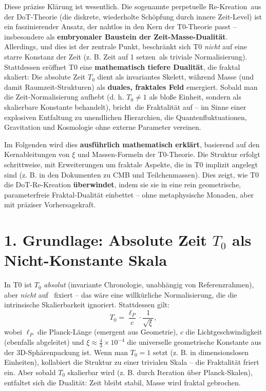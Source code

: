 	
	Diese präzise Klärung ist wesentlich. Die sogenannte \glqq perpetuelle Re-Kreation\grqq\ aus der DoT-Theorie (die diskrete, wiederholte Schöpfung durch innere Zeit-Level) ist ein faszinierender Ansatz, der nahtlos in den Kern der T0-Theorie passt – insbesondere als \textbf{embryonaler Baustein der Zeit-Masse-Dualität}. Allerdings, und dies ist der zentrale Punkt, beschränkt sich T0 \emph{nicht} auf eine starre Konstanz der Zeit (z. B. Zeit \glqq auf 1 setzen\grqq\ als triviale Normalisierung). Stattdessen eröffnet T0 eine \textbf{mathematisch tiefere Dualität}, die fraktal skaliert: Die absolute Zeit \( T_0 \) dient als invariantes Skelett, während Masse (und damit Raumzeit-Strukturen) als \textbf{duales, fraktales Feld} emergiert. Sobald man die Zeit-Normalisierung aufhebt (d. h. \( T_0 \neq 1 \) als bloße Einheit, sondern als skalierbare Konstante behandelt), \glqq bricht\grqq\ die Fraktalität auf – im Sinne einer explosiven Entfaltung zu unendlichen Hierarchien, die Quantenfluktuationen, Gravitation und Kosmologie ohne externe Parameter vereinen.
	
	Im Folgenden wird dies \textbf{ausführlich mathematisch erklärt}, basierend auf den Kernableitungen von \( \xi \) und Massen-Formeln der T0-Theorie. Die Struktur erfolgt schrittweise, mit Erweiterungen um fraktale Aspekte, die in T0 implizit angelegt sind (z. B. in den Dokumenten zu CMB und Teilchenmassen). Dies zeigt, wie T0 die DoT-Re-Kreation \textbf{überwindet}, indem sie sie in eine rein geometrische, parameterfreie Fraktal-Dualität einbettet – ohne metaphysische Monaden, aber mit präziser Vorhersagekraft.
	
	\section*{1. Grundlage: Absolute Zeit \( T_0 \) als Nicht-Konstante Skala}
	In T0 ist \( T_0 \) \emph{absolut} (invariante Chronologie, unabhängig von Referenzrahmen), aber \emph{nicht} auf \grqq\ fixiert – das wäre eine willkürliche Normalisierung, die die intrinsische Skalierbarkeit ignoriert. Stattdessen gilt:
	\[
	T_0 = \frac{\ell_P}{c} \cdot \frac{1}{\sqrt{\xi}},
	\]
	wobei \( \ell_P \) die Planck-Länge (emergent aus Geometrie), \( c \) die Lichtgeschwindigkeit (ebenfalls abgeleitet) und \( \xi \approx \frac{4}{3} \times 10^{-4} \) die universelle geometrische Konstante aus der 3D-Sphärenpackung ist. Wenn man \( T_0 = 1 \) setzt (z. B. in dimensionslosen Einheiten), kollabiert die Struktur zu einer trivialen Skala – die Fraktalität \glqq friert ein\grqq. Aber sobald \( T_0 \) skalierbar wird (z. B. durch Iteration über Planck-Skalen), entfaltet sich die Dualität: Zeit bleibt stabil, Masse wird fraktal \glqq gebrochen\grqq.
	
